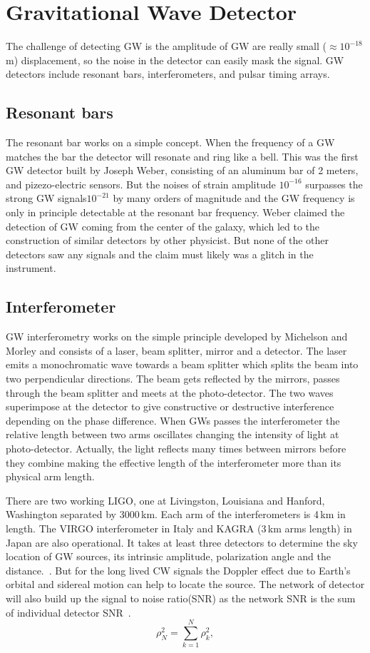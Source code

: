 \documentclass{ttuthes2007}
\begin{document}
\section{Gravitational Wave Detector}
The challenge of detecting \ac{GW} is the amplitude of \ac{GW} are really small
 ($\approx10^{-18}$\,m) displacement, so the noise in the detector can easily mask the signal.
\ac{GW} detectors include resonant bars, interferometers, and pulsar
timing arrays. 

\subsection{Resonant bars}

The resonant bar works on a simple concept. When the frequency of a
\ac{GW} matches the bar the detector will resonate and ring like a bell. This
was the first \ac{GW} detector built by Joseph Weber, consisting of an
aluminum bar of 2 meters, and pizezo-electric sensors. But the
noises of strain amplitude $10^{-16}$ surpasses the strong \ac{GW}
signals$10^{-21}$ by many orders of
magnitude and the GW frequency is only in principle detectable at the resonant
bar frequency. Weber claimed the detection of \ac{GW} coming from the center of
 the galaxy, which led to the construction of similar detectors by other physicist. But none of the
other detectors saw any signals and the claim must likely was a glitch in the
instrument.
\subsection{Interferometer}
\ac{GW} interferometry works on the simple principle
developed by Michelson and Morley and consists of a laser, beam splitter,
mirror and a detector. The laser emits a monochromatic wave towards a beam
splitter which splits the beam into two perpendicular directions. The beam gets
reflected by the mirrors, passes through the beam splitter and meets at the
photo-detector. The two waves superimpose at the detector to give constructive or
destructive interference depending on the phase difference. When \acp{GW} passes
the interferometer the relative length between two arms oscillates changing the
intensity of light at photo-detector. Actually, the light reflects many times
between mirrors before they combine making the effective length of the
interferometer more than its physical arm length.

There are two working \ac{LIGO}, one at Livingston, Louisiana and Hanford, Washington 
separated by 3000\,km. Each arm of the interferometers is 4\,km in length. The
VIRGO interferometer in Italy and KAGRA (3\,km arms length) in Japan are also
operational. It takes at least three detectors to determine the sky location of 
\ac{GW} sources, its intrinsic amplitude, polarization angle and the
distance.~\cite{Schutz_2011}. But for the long lived \ac{CW} signals the Doppler effect
due to Earth's orbital and sidereal motion can help to locate the source. The
network of detector will also build up the signal to noise ratio(SNR) as the
network SNR is the sum of individual detector SNR~\cite{Schutz_2011}.
\begin{equation}
\rho_N^2=\sum_{k=1}^N \rho_k^2 ,
\end{equation}
\end{document}
